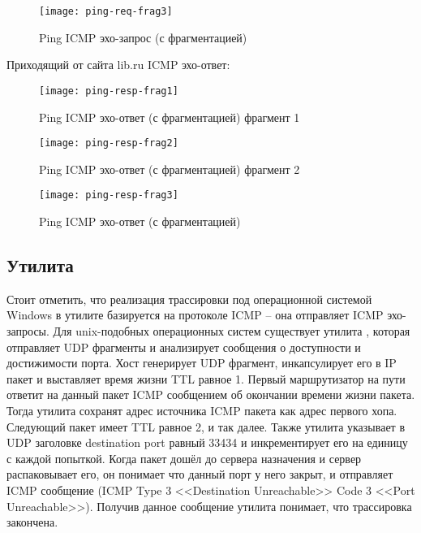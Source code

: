 \begin{figure}[H]
	\centering
	\texttt{[image: ping-req-frag3]}
	\caption{Ping ICMP эхо-запрос (с фрагментацией)}
	\label{fig:ping-req-frag}
\end{figure}

Приходящий от сайта lib.ru ICMP эхо-ответ:

\begin{figure}[H]
	\centering
	\texttt{[image: ping-resp-frag1]}
	\caption{Ping ICMP эхо-ответ (с фрагментацией) фрагмент 1}
	\label{fig:ping-resp-frag}
\end{figure}

\begin{figure}[H]
	\centering
	\texttt{[image: ping-resp-frag2]}
	\caption{Ping ICMP эхо-ответ (с фрагментацией) фрагмент 2}
	\label{fig:ping-resp-frag}
\end{figure}

\begin{figure}[H]
	\centering
	\texttt{[image: ping-resp-frag3]}
	\caption{Ping ICMP эхо-ответ (с фрагментацией)}
	\label{fig:ping-resp-frag}
\end{figure}

\subsection{Утилита }\label{sec:traceroute}

Стоит отметить, что реализация трассировки под операционной системой Windows в утилите  базируется на протоколе ICMP -- она отправляет ICMP эхо-запросы. Для unix-подобных операционных систем существует утилита , которая отправляет UDP фрагменты и анализирует сообщения о доступности и достижимости порта. Хост генерирует UDP фрагмент, инкапсулирует его в IP пакет и выставляет время жизни TTL равное 1. Первый маршрутизатор на пути ответит на данный пакет ICMP сообщением об окончании времени жизни пакета. Тогда утилита сохранят адрес источника ICMP пакета как адрес первого хопа. Следующий пакет имеет TTL равное 2, и так далее. Также утилита указывает в UDP заголовке destination port равный 33434 и инкрементирует его на единицу с каждой попыткой. Когда пакет дошёл до сервера назначения и сервер распаковывает его, он понимает что данный порт у него закрыт, и отправляет ICMP сообщение (ICMP Type 3 <<Destination Unreachable>> Code 3 <<Port Unreachable>>). Получив данное сообщение утилита понимает, что трассировка закончена.

